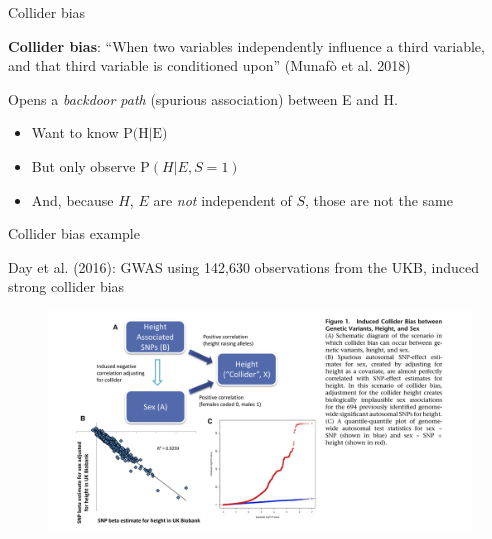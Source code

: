 \documentclass[
  ignorenonframetext,
]{beamer}
\providecommand{\tightlist}{%
  \setlength{\itemsep}{0pt}\setlength{\parskip}{0pt}}
\begin{document}
\begin{frame}{Collider bias}
\protect\hypertarget{collider-bias}{}

\begin{figure}
\centering
{}
\end{figure}

\textbf{Collider bias}: ``When two variables independently influence a
third variable, and that third variable is conditioned upon'' (Munafò et
al. 2018)

Opens a \emph{backdoor path} (spurious association) between E and H.

\begin{itemize}
\tightlist
\item
  Want to know \(\text{P(H|E)}\)
\item
  But only observe \(\text{P}(H | E, S = 1)\)
\item
  And, because \(H\), \(E\) are \emph{not} independent of \(S\), those
  are not the same
\end{itemize}

\end{frame}

\begin{frame}{Collider bias example}
\protect\hypertarget{collider-bias-example}{}

Day et al. (2016): GWAS using 142,630 observations from the UKB, induced
strong collider bias

\begin{figure}
\centering
\includegraphics[width=\textwidth]{collider_bias_example.png}
\end{figure}

\end{frame}
\end{document}
